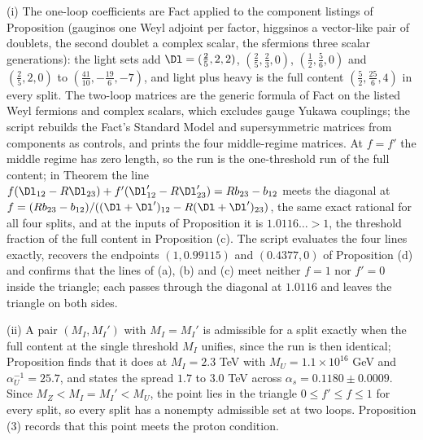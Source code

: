 (i) The one-loop coefficients are Fact  applied to the component listings of Proposition  (gauginos one Weyl adjoint per factor, higgsinos a vector-like pair of doublets, the second doublet a complex scalar, the sfermions three scalar generations): the light sets add $\Dl = (\tfrac25, 2, 2)$, $(\tfrac25, \tfrac23, 0)$, $(\tfrac12, \tfrac56, 0)$ and $(\tfrac25, 2, 0)$ to $(\tfrac{41}{10}, -\tfrac{19}{6}, -7)$, and light plus heavy is the full content $(\tfrac52, \tfrac{25}{6}, 4)$ in every split. The two-loop matrices are the generic formula of Fact  on the listed Weyl fermions and complex scalars, which excludes gauge Yukawa couplings; the script rebuilds the Fact's Standard Model and supersymmetric matrices from components as controls, and prints the four middle-regime matrices. At $f = f'$ the middle regime has zero length, so the run is the one-threshold run of the full content; in Theorem  the line $f(\Dl_{12} - R\Dl_{23}) + f'(\Dl'_{12} - R\Dl'_{23}) = Rb_{23} - b_{12}$ meets the diagonal at $f = (Rb_{23} - b_{12})/((\Dl + \Dl')_{12} - R(\Dl + \Dl')_{23})$, the same exact rational for all four splits, and at the inputs of Proposition  it is $1.0116\ldots > 1$, the threshold fraction of the full content in Proposition (c). The script evaluates the four lines exactly, recovers the endpoints $(1, 0.99115)$ and $(0.4377, 0)$ of Proposition (d) and confirms that the lines of (a), (b) and (c) meet neither $f = 1$ nor $f' = 0$ inside the triangle; each passes through the diagonal at $1.0116$ and leaves the triangle on both sides.

(ii) A pair $(M_{I}, M_{I}')$ with $M_{I} = M_{I}'$ is admissible for a split exactly when the full content at the single threshold $M_{I}$ unifies, since the run is then identical; Proposition  finds that it does at $M_{I} = 2.3$ TeV with $M_{U} = 1.1 \times 10^{16}$ GeV and $\alpha_{U}^{-1} = 25.7$, and states the spread $1.7$ to $3.0$ TeV across $\alpha_{s} = 0.1180 \pm 0.0009$. Since $M_{Z} < M_{I} = M_{I}' < M_{U}$, the point lies in the triangle $0 \le f' \le f \le 1$ for every split, so every split has a nonempty admissible set at two loops. Proposition (3) records that this point meets the proton condition.

